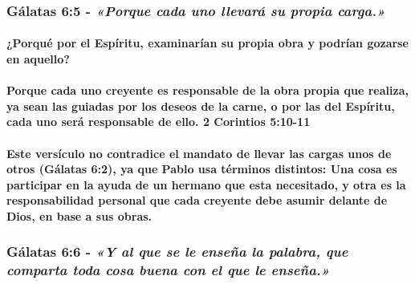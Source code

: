 \documentclass[11a pt,twoside]{article}
\newcommand{\scripture}[1]{%
  {\fontsize{12pt}{16pt}\selectfont\ScriptureFont\itshape #1}%
}
\let\oldsubsubsection\subsubsection
\renewcommand{\subsubsection}{\needspace{4\baselineskip}\oldsubsubsection}
\let\oldparagraph\paragraph
\renewcommand{\paragraph}{\needspace{3\baselineskip}\oldparagraph}
\begin{document}
\subsubsection{\texorpdfstring{Gálatas 6:5 -
\scripture{«Porque cada uno llevará su propia carga.»}}{Gálatas 6:5 - }}\label{guxe1latas-65---porque-cada-uno-llevaruxe1-su-propia-carga.}

\paragraph{¿Porqué por el Espíritu, examinarían su propia obra y podrían
gozarse en
aquello?}\label{porquuxe9-por-el-espuxedritu-examinaruxedan-su-propia-obra-y-podruxedan-gozarse-en-aquello}

\paragraph{Porque cada uno creyente es responsable de la obra propia que
realiza, ya sean las guiadas por los deseos de la carne, o por las del
Espíritu, cada uno será responsable de ello. 2 Corintios
5:10-11}\label{porque-cada-uno-creyente-es-responsable-de-la-obra-propia-que-realiza-ya-sean-las-guiadas-por-los-deseos-de-la-carne-o-por-las-del-espuxedritu-cada-uno-seruxe1-responsable-de-ello.-2-corintios-510-11}

\paragraph{Este versículo no contradice el mandato de llevar las cargas
unos de otros (Gálatas 6:2), ya que Pablo usa términos distintos: Una
cosa es participar en la ayuda de un hermano que esta necesitado, y otra
es la responsabilidad personal que cada creyente debe asumir delante de
Dios, en base a sus
obras.}\label{este-versuxedculo-no-contradice-el-mandato-de-llevar-las-cargas-unos-de-otros-guxe1latas-62-ya-que-pablo-usa-tuxe9rminos-distintos-una-cosa-es-participar-en-la-ayuda-de-un-hermano-que-esta-necesitado-y-otra-es-la-responsabilidad-personal-que-cada-creyente-debe-asumir-delante-de-dios-en-base-a-sus-obras.}

\subsubsection{\texorpdfstring{Gálatas 6:6 -
\scripture{«Y al que se le enseña la palabra, que comparta toda cosa buena con el que le enseña.»}}{Gálatas 6:6 - }}\label{guxe1latas-66---y-al-que-se-le-enseuxf1a-la-palabra-que-comparta-toda-cosa-buena-con-el-que-le-enseuxf1a.}
\end{document}
